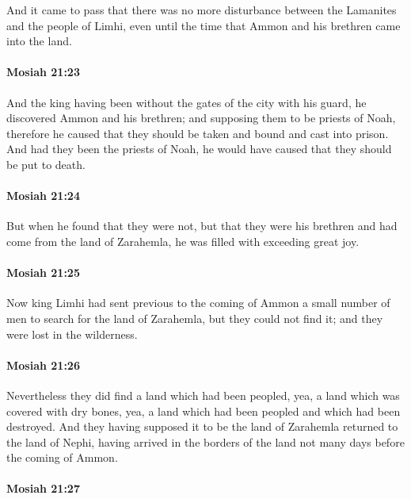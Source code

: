 			And it came to pass that there was no more disturbance
			between the Lamanites and the people of Limhi,
			even until the time that Ammon and his brethren came into the land.

		\paragraph{Mosiah 21:23} %
			\label{MOSIAH-21-23}

			And the king having been without the gates of the city with his guard,
			he discovered Ammon and his brethren;
			and supposing them to be priests of Noah,
			therefore he caused that they should be taken and bound and cast into prison.
			And had they been the priests of Noah,
			he would have caused that they should be put to death.

		\paragraph{Mosiah 21:24} %
			\label{MOSIAH-21-24}

			But when he found that they were not,
			but that they were his brethren and had come from the land of Zarahemla,
			he was filled with exceeding great joy.

		\paragraph{Mosiah 21:25} %
			\label{MOSIAH-21-25}

			Now king Limhi had sent previous to the coming of Ammon
			a small number of men to search for the land of Zarahemla,
			but they could not find it;
			and they were lost in the wilderness.

		\paragraph{Mosiah 21:26} %
			\label{MOSIAH-21-26}

			Nevertheless they did find a land which had been peopled,
			yea, a land which was covered with dry bones,
			yea, a land which had been peopled and which had been destroyed.
			And they having supposed it to be the land of Zarahemla
			returned to the land of Nephi,
			having arrived in the borders of the land
			not many days before the coming of Ammon.

		\paragraph{Mosiah 21:27} %
			\label{MOSIAH-21-27}


